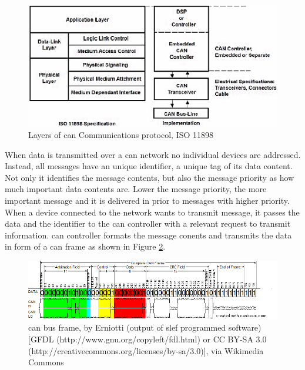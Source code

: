 \begin{figure}[H]
\begin{center}
\captionsetup{font=small}
\includegraphics[scale=0.5]{pics/iso_osi_can.png}
\caption{Layers of \gls{can} Communications protocol, ISO 11898}
\label{fig:iso_osi_can}
\end{center}
\end{figure}
When data is transmitted over a \gls{can} network no individual devices are addressed. Instead, all messages have an unique identifier, a unique tag of its data content. Not only it identifies the message contents, but also the message priority as how much important data contents are. Lower the message priority, the more important message and it is delivered in prior to messages with higher priority. When a device connected to the network wants to transmit message, it passes the data and the identifier to the \gls{can} controller with a relevant request to transmit information. \gls{can} controller formats the message conents and transmits the data in form of a \gls{can} frame as shown in Figure \ref{fig:can_bus_frame}.
\begin{figure}[H]
\begin{center}
\captionsetup{font=small}
\includegraphics[scale=0.55]{pics/can_bus_frame.png}
\caption{\gls{can} bus frame, by Erniotti (output of slef programmed software) [GFDL (http://www.gnu.org/copyleft/fdl.html) or CC BY-SA 3.0 (http://creativecommons.org/licenses/by-sa/3.0)], via Wikimedia Commons}
\label{fig:can_bus_frame}
\end{center}
\end{figure}
